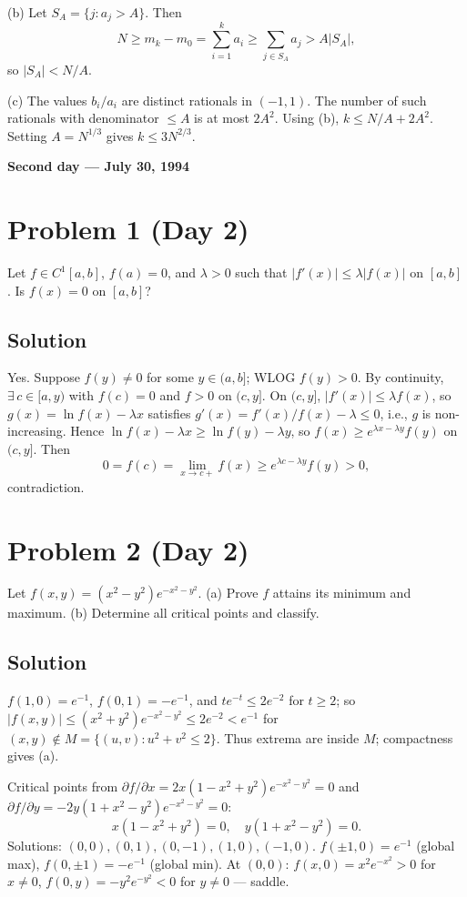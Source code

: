 \documentclass{article}
\begin{document}
(b) Let $S_A = \{j : a_j > A\}$. Then
\[
N \geq m_k - m_0 = \sum_{i=1}^k a_i \geq \sum_{j \in S_A} a_j > A|S_A|,
\]
so $|S_A| < N/A$.

(c) The values $b_i/a_i$ are distinct rationals in $(-1,1)$. The number of such rationals with denominator $\leq A$ is at most $2A^2$. Using (b), $k \leq N/A + 2A^2$. Setting $A = N^{1/3}$ gives $k \leq 3N^{2/3}$.

\begin{center}\textbf{Second day --- July 30, 1994}\end{center}

\section*{Problem 1 (Day 2)}
Let $f \in C^1[a,b]$, $f(a) = 0$, and $\lambda > 0$ such that $|f'(x)| \leq \lambda |f(x)|$ on $[a,b]$. Is $f(x) = 0$ on $[a,b]$?

\subsection*{Solution}
Yes. Suppose $f(y) \neq 0$ for some $y \in (a,b]$; WLOG $f(y) > 0$. By continuity, $\exists\, c \in [a, y)$ with $f(c) = 0$ and $f > 0$ on $(c, y]$. On $(c, y]$, $|f'(x)| \leq \lambda f(x)$, so $g(x) = \ln f(x) - \lambda x$ satisfies $g'(x) = f'(x)/f(x) - \lambda \leq 0$, i.e., $g$ is non-increasing. Hence $\ln f(x) - \lambda x \geq \ln f(y) - \lambda y$, so $f(x) \geq e^{\lambda x - \lambda y} f(y)$ on $(c, y]$. Then
\[
0 = f(c) = \lim_{x\to c+} f(x) \geq e^{\lambda c - \lambda y} f(y) > 0,
\]
contradiction.

\section*{Problem 2 (Day 2)}
Let $f(x,y) = (x^2 - y^2)e^{-x^2 - y^2}$.
(a) Prove $f$ attains its minimum and maximum.
(b) Determine all critical points and classify.

\subsection*{Solution}
$f(1,0) = e^{-1}$, $f(0,1) = -e^{-1}$, and $te^{-t} \leq 2e^{-2}$ for $t \geq 2$; so $|f(x,y)| \leq (x^2+y^2)e^{-x^2-y^2} \leq 2e^{-2} < e^{-1}$ for $(x,y) \notin M = \{(u,v):u^2+v^2\leq 2\}$. Thus extrema are inside $M$; compactness gives (a).

Critical points from $\partial f/\partial x = 2x(1 - x^2 + y^2)e^{-x^2-y^2} = 0$ and $\partial f/\partial y = -2y(1 + x^2 - y^2)e^{-x^2-y^2} = 0$:
\[
x(1 - x^2 + y^2) = 0, \quad y(1 + x^2 - y^2) = 0.
\]
Solutions: $(0,0), (0,1), (0,-1), (1,0), (-1,0)$. $f(\pm 1, 0) = e^{-1}$ (global max), $f(0, \pm 1) = -e^{-1}$ (global min). At $(0,0)$: $f(x,0) = x^2 e^{-x^2} > 0$ for $x \neq 0$, $f(0,y) = -y^2 e^{-y^2} < 0$ for $y \neq 0$ — saddle.
\end{document}
